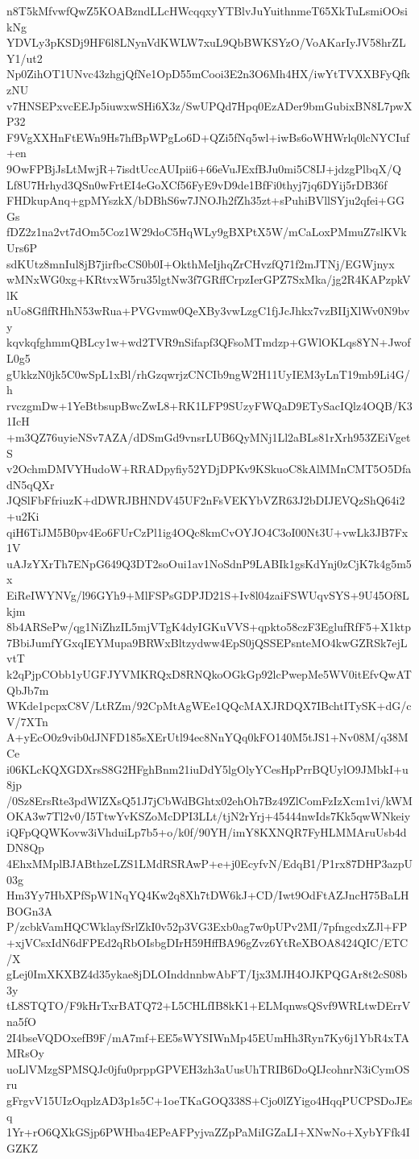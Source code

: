 n8T5kMfvwfQwZ5KOABzndLLcHWcqqxyYTBlvJuYuithnmeT65XkTuLsmiOOsikNg
YDVLy3pKSDj9HF6l8LNynVdKWLW7xuL9QbBWKSYzO/VoAKarIyJV58hrZLY1/ut2
Np0ZihOT1UNvc43zhgjQfNe1OpD55mCooi3E2n3O6Mh4HX/iwYtTVXXBFyQfkzNU
v7HNSEPxvcEEJp5iuwxwSHi6X3z/SwUPQd7Hpq0EzADer9bmGubixBN8L7pwXP32
F9VgXXHnFtEWn9Hs7hfBpWPgLo6D+QZi5fNq5wl+iwBs6oWHWrlq0lcNYCIuf+en
9OwFPBjJsLtMwjR+7isdtUccAUIpii6+66eVuJExfBJu0mi5C8IJ+jdzgPlbqX/Q
Lf8U7Hrhyd3QSn0wFrtEI4eGoXCf56FyE9vD9de1BfFi0thyj7jq6DYij5rDB36f
FHDkupAnq+gpMYszkX/bDBhS6w7JNOJh2fZh35zt+sPuhiBVllSYju2qfei+GGGs
fDZ2z1na2vt7dOm5Coz1W29doC5HqWLy9gBXPtX5W/mCaLoxPMmuZ7slKVkUrs6P
sdKUtz8mnIul8jB7jirfbcCS0b0I+OkthMeIjhqZrCHvzfQ71f2mJTNj/EGWjnyx
wMNxWG0xg+KRtvxW5ru35lgtNw3f7GRffCrpzIerGPZ7SxMka/jg2R4KAPzpkVlK
nUo8GflfRHhN53wRua+PVGvmw0QeXBy3vwLzgC1fjJcJhkx7vzBIIjXlWv0N9bvy
kqvkqfghmmQBLcy1w+wd2TVR9nSifapf3QFsoMTmdzp+GWlOKLqs8YN+JwofL0g5
gUkkzN0jk5C0wSpL1xBl/rhGzqwrjzCNCIb9ngW2H11UyIEM3yLnT19mb9Li4G/h
rvczgmDw+1YeBtbsupBwcZwL8+RK1LFP9SUzyFWQaD9ETySacIQlz4OQB/K31IcH
+m3QZ76uyieNSv7AZA/dDSmGd9vnsrLUB6QyMNj1Ll2aBLs81rXrh953ZEiVgetS
v2OchmDMVYHudoW+RRADpyfiy52YDjDPKv9KSkuoC8kAlMMnCMT5O5DfadN5qQXr
JQSlFbFfriuzK+dDWRJBHNDV45UF2nFsVEKYbVZR63J2bDIJEVQzShQ64i2+u2Ki
qiH6TiJM5B0pv4Eo6FUrCzPl1ig4OQc8kmCvOYJO4C3oI00Nt3U+vwLk3JB7Fx1V
uAJzYXrTh7ENpG649Q3DT2soOui1av1NoSdnP9LABIk1gsKdYnj0zCjK7k4g5m5x
EiReIWYNVg/l96GYh9+MlFSPsGDPJD21S+Iv8l04zaiFSWUqvSYS+9U45Of8Lkjm
8b4ARSePw/qg1NiZhzIL5mjVTgK4dyIGKuVVS+qpkto58czF3EglufRfF5+X1ktp
7BbiJumfYGxqIEYMupa9BRWxBltzydww4EpS0jQSSEPsnteMO4kwGZRSk7ejLvtT
k2qPjpCObb1yUGFJYVMKRQxD8RNQkoOGkGp92lcPwepMe5WV0itEfvQwATQbJb7m
WKde1pcpxC8V/LtRZm/92CpMtAgWEe1QQcMAXJRDQX7IBchtITySK+dG/cV/7XTn
A+yEcO0z9vib0dJNFD185sXErUtl94ec8NnYQq0kFO140M5tJS1+Nv08M/q38MCe
i06KLcKQXGDXrsS8G2HFghBnm21iuDdY5lgOlyYCesHpPrrBQUylO9JMbkI+u8jp
/0Sz8ErsRte3pdWlZXsQ51J7jCbWdBGhtx02ehOh7Bz49ZlComFzIzXcm1vi/kWM
OKA3w7Tl2v0/I5TtwYvKSZoMcDPI3LLt/tjN2rYrj+45444nwIds7Kk5qwWNkeiy
iQFpQQWKovw3iVhduiLp7b5+o/k0f/90YH/imY8KXNQR7FyHLMMAruUsb4dDN8Qp
4EhxMMplBJABthzeLZS1LMdRSRAwP+e+j0EcyfvN/EdqB1/P1rx87DHP3azpU03g
Hm3Yy7HbXPfSpW1NqYQ4Kw2q8Xh7tDW6kJ+CD/Iwt9OdFtAZJncH75BaLHBOGn3A
P/zcbkVamHQCWklayfSrlZkI0v52p3VG3Exb0ag7w0pUPv2MI/7pfngcdxZJl+FP
+xjVCsxIdN6dFPEd2qRbOIsbgDIrH59HffBA96gZvz6YtReXBOA8424QIC/ETC/X
gLej0ImXKXBZ4d35ykae8jDLOInddnnbwAbFT/Ijx3MJH4OJKPQGAr8t2cS08b3y
tL8STQTO/F9kHrTxrBATQ72+L5CHLfIB8kK1+ELMqnwsQSvf9WRLtwDErrVna5fO
2I4bseVQDOxefB9F/mA7mf+EE5sWYSIWnMp45EUmHh3Ryn7Ky6j1YbR4xTAMRsOy
uoLlVMzgSPMSQJc0jfu0prppGPVEH3zh3aUusUhTRIB6DoQIJcohnrN3iCymOSru
gFrgvV15UIzOqplzAD3p1s5C+1oeTKaGOQ338S+Cjo0lZYigo4HqqPUCPSDoJEsq
1Yr+rO6QXkGSjp6PWHba4EPeAFPyjvaZZpPaMiIGZaLI+XNwNo+XybYFfk4IGZKZ
